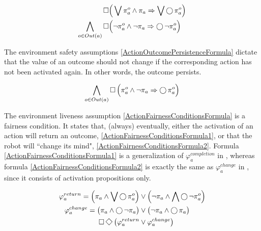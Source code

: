 \begin{subequations}
	\label{ActionOutcomeConstraintsFormula}
	\begin{align}
		\operatorname{\Box}& \Big( \bigvee \pi_a^o \wedge \pi_a \Rightarrow \bigvee \operatorname{\bigcirc} \pi_a^o \Big)\label{ActionOutcomeConstraintsFormula3}\\
		\bigwedge \limits_{o \in Out(a)} \operatorname{\Box}& \Big( \lnot \pi_a^o \wedge \lnot \pi_a \Rightarrow \operatorname{\bigcirc} \lnot \pi_a^o \Big)\label{ActionOutcomeConstraintsFormula4}
	\end{align}
\end{subequations}

The environment safety assumptions \eqref{ActionOutcomePersistenceFormula} dictate that the value of an outcome should not change if the corresponding action has not been activated again. 
In other words, the outcome persists.

\begin{equation}\label{ActionOutcomePersistenceFormula}
	\bigwedge \limits_{o \in Out(a)} \operatorname{\Box} \Big( \pi_a^o \wedge \lnot \pi_a \Rightarrow \operatorname{\bigcirc} \pi_a^o \Big)
\end{equation}

The environment liveness assumption \eqref{ActionFairnessConditionsFormula} is a fairness condition.
It states that, (always) eventually, either the activation of an action will return an outcome, \eqref{ActionFairnessConditionsFormula1}, or that the robot will ``change its mind", \eqref{ActionFairnessConditionsFormula2}.
Formula \eqref{ActionFairnessConditionsFormula1} is a generalization of $\varphi_a^{completion}$ in \cite{Vasu2013ICRA}, whereas formula \eqref{ActionFairnessConditionsFormula2} is exactly the same as $\varphi_a^{change}$ in \cite{Vasu2013ICRA}, since it consists of activation propositions only.

\begin{subequations}
	\begin{align}
		\varphi_a^{return} = \Big( \pi_a \wedge \bigvee \LTLX \pi_a^o \Big) &\vee \Big( \lnot \pi_a \wedge \bigwedge \LTLX \lnot \pi_a^o \Big)\label{ActionFairnessConditionsFormula1}\\
		\varphi_a^{change} = \big( \pi_a \wedge \LTLX \lnot \pi_a \big) &\vee \big( \lnot \pi_a \wedge \LTLX \pi_a \big)\label{ActionFairnessConditionsFormula2}\\
		\LTLG \LTLF \big( \varphi_a^{return} &\vee \varphi_a^{change} \big)\label{ActionFairnessConditionsFormula}
	\end{align}
\end{subequations}

